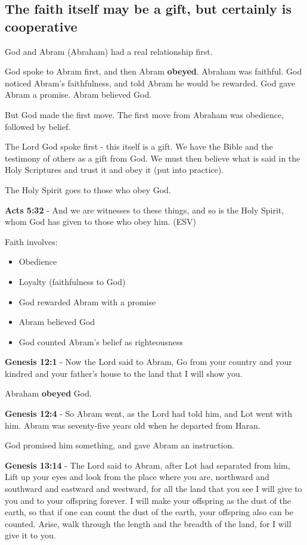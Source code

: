 \documentclass[11pt]{article}
\begin{document}
\subsection{The faith itself may be a gift, but certainly is cooperative}
\label{sec:org7197ef5}
God and Abram (Abraham) had a real relationship first.

God spoke to Abram first, and then Abram \textbf{obeyed}.
Abraham was faithful.
God noticed Abram's faithfulness, and told Abram he would be rewarded.
God gave Abram a promise.
Abram believed God.

But God made the first move.
The first move from Abraham was obedience, followed by belief.

The Lord God spoke first - this itself is a gift. We have the Bible and the testimony of others as a gift from God.
We must then believe what is said in the Holy Scriptures and trust it and obey it (put into practice).

The Holy Spirit goes to those who obey God.

\textbf{Acts 5:32} - And we are witnesses to these things, and so is the Holy Spirit, whom God has given to those who obey him. (ESV)

Faith involves:
\begin{itemize}
\item Obedience
\item Loyalty (faithfulness to God)
\item God rewarded Abram with a promise
\item Abram believed God
\item God counted Abram's belief as righteousness
\end{itemize}

\textbf{Genesis 12:1} - Now the Lord said to Abram, Go from your country and your kindred and your father's house to the land that I will show you.

Abraham \textbf{obeyed} God.

\textbf{Genesis 12:4} - So Abram went, as the Lord had told him, and Lot went with him. Abram was seventy-five years old when he departed from Haran.

God promised him something, and gave Abram an instruction.

\textbf{Genesis 13:14} - The Lord said to Abram, after Lot had separated from him, Lift up your eyes and look from the place where you are, northward and southward and eastward and westward, for all the land that you see I will give to you and to your offspring forever.  I will make your offspring as the dust of the earth, so that if one can count the dust of the earth, your offspring also can be counted. Arise, walk through the length and the breadth of the land, for I will give it to you.
\end{document}
